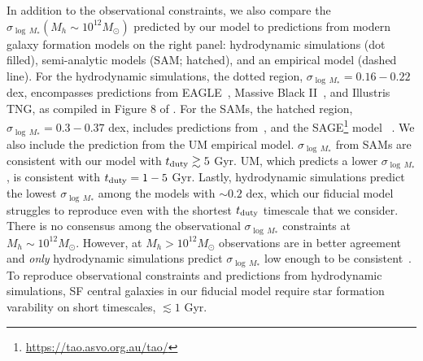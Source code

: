 \documentclass[12pt, letterpaper, preprint, tighten]{aastex62}
\newcommand{\edt}[1]{{\color{dred}{\bf} #1}}
\begin{document}
In addition to the observational constraints, we also compare the $\sigma_{\log\,M_*}(M_h \sim 10^{12}M_\odot)$
predicted by our model to predictions from modern galaxy formation models
on the right panel: hydrodynamic simulations (dot filled), semi-analytic models
(SAM; hatched), and an empirical model (dashed line). For the hydrodynamic simulations,
the dotted region, $\sigma_{\log\,M_*} = 0.16 - 0.22$ dex, encompasses
predictions from EAGLE~\citep{matthee2017}, Massive Black II~\citep{khandai2015},
and Illustris TNG, as compiled in Figure 8 of \cite{wechsler2018}.
For the SAMs, the hatched region, $\sigma_{\log\,M_*} = 0.3 - 0.37$ dex,
includes predictions from~\cite{lu2014, somerville2012}, and the SAGE\footnote{\url{https://tao.asvo.org.au/tao/}}
model~\edt{\citep{croton2016}}. We also include the prediction from the
\cite{behroozi2018} UM empirical model. $\sigma_{\log\,M_*}$ from SAMs are
consistent with our model with $t_{\rm duty} \gtrsim 5$ Gyr. UM, which predicts
a lower $\sigma_{\log\,M_*}$, is consistent with $t_{\rm duty} = 1 - 5$ Gyr.
Lastly, hydrodynamic simulations predict the lowest $\sigma_{\log\,M_*}$ among
the models
\edt{with $\sim 0.2$ dex, which our fiducial model struggles to reproduce
even with the shortest $t_{\rm duty}$ timescale that we consider.
There is no consensus among the observational $\sigma_{\log\,M_*}$ constraints
at $M_h \sim 10^{12} M_\odot$. However, at $M_h > 10^{12} M_\odot$ observations
are in better agreement and {\em only} hydrodynamic simulations predict $\sigma_{\log\,M_*}$
low enough to be consistent~\citep{wechsler2018}. To reproduce observational
constraints and predictions from hydrodynamic simulations, SF central galaxies
in our fiducial model require star formation varability on short timescales,
$\lesssim 1$ Gyr.}
\end{document}
